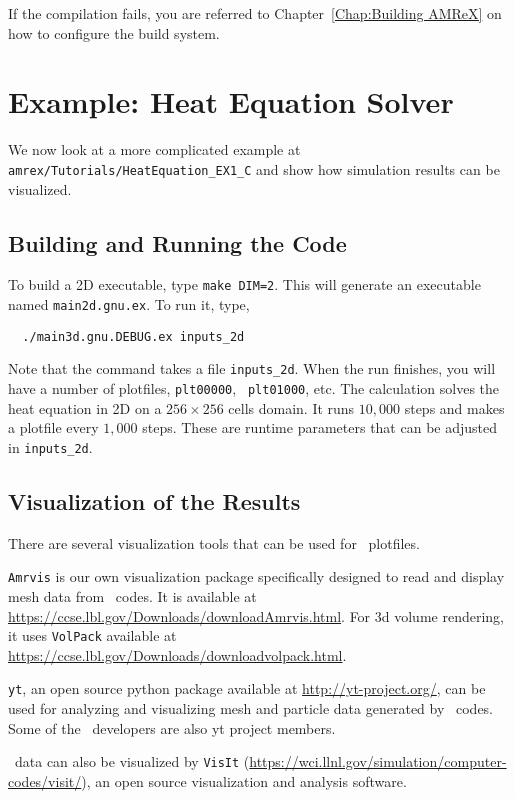 If the compilation fails, you are referred to
Chapter~\ref{Chap:Building AMReX} on how to configure the build
system.

\section{Example: Heat Equation Solver}

We now look at a more complicated example at {\tt
  amrex/Tutorials/HeatEquation\_EX1\_C} and show how simulation
results can be visualized.

\subsection{Building and Running the Code}

To build a 2D executable, type {\tt make DIM=2}.  This will generate
an executable named {\tt main2d.gnu.ex}.  To run it, type,
\begin{verbatim}
  ./main3d.gnu.DEBUG.ex inputs_2d
\end{verbatim}
Note that the command takes a file {\tt inputs\_2d}.  When the run
finishes, you will have a number of plotfiles, {\tt plt00000}, {\tt
  plt01000}, etc.  The calculation solves the heat equation in 2D on a
$256 \times 256$ cells domain.  It runs $10,000$ steps and makes a
plotfile every $1,000$ steps.  These are runtime parameters that can
be adjusted in {\tt inputs\_2d}.

\subsection{Visualization of the Results}

There are several visualization tools that can be used for \amrex\
plotfiles.  

{\tt Amrvis} is our own visualization package specifically designed to
read and display mesh data from \amrex\ codes.  It is available at
\url{https://ccse.lbl.gov/Downloads/downloadAmrvis.html}.  For 3d
volume rendering, it uses {\tt VolPack} available at
\url{https://ccse.lbl.gov/Downloads/downloadvolpack.html}.

{\tt yt}, an open source python package available at
\url{http://yt-project.org/}, can be used for analyzing and
visualizing mesh and particle data generated by \amrex\ codes.  Some
of the \amrex\ developers are also yt project members.

\amrex\ data can also be visualized by {\tt VisIt}
(\url{https://wci.llnl.gov/simulation/computer-codes/visit/}), an open
source visualization and analysis software.

